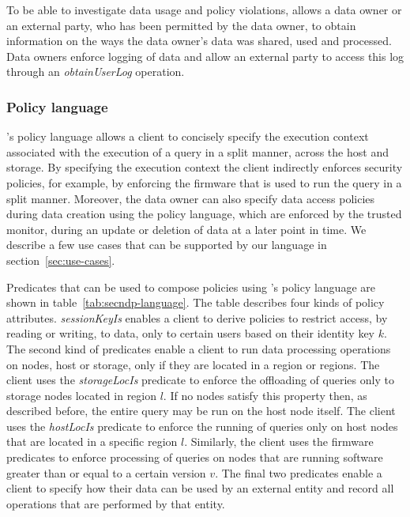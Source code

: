 To be able to investigate data usage and policy violations, \project{} allows a data owner or an external party, who has been permitted by the data owner, to obtain information on the ways the data owner's data was shared, used and processed. Data owners enforce logging of data and allow an external party to access this log through an \emph{obtainUserLog} operation.

\subsubsection{Policy language}


\project{}'s policy language allows a client to concisely specify the execution context associated with the execution of a query in a split manner, across the host and storage. By specifying the execution context the client indirectly enforces security policies, for example, by enforcing the firmware that is used to run the query in a split manner. Moreover, the data owner can also specify data access policies during data creation using the policy language, which are enforced by the trusted monitor, during an update or deletion of data at a later point in time. We describe a few use cases that can be supported by our language in section~\ref{sec:use-cases}.

Predicates that can be used to compose policies using \project{}'s policy language are shown in table~\ref{tab:secndp-language}. The table describes four kinds of policy attributes. \emph{sessionKeyIs} enables a client to derive policies to restrict access, by reading or writing, to data, only to certain users based on their identity key $k$. The second kind of predicates enable a client to run data processing operations on nodes, host or storage, only if they are located in a region or regions. The client uses the \emph{storageLocIs} predicate to enforce the offloading of queries only to storage nodes located in region $l$. If no nodes satisfy this property then, as described before, the entire query may be run on the host node itself. The client uses the \emph{hostLocIs} predicate to enforce the running of queries only on host nodes that are located in a specific region $l$. Similarly, the client uses the firmware predicates to enforce processing of queries on nodes that are running software greater than or equal to a certain version $v$. The final two predicates enable a client to specify how their data can be used by an external entity and record all operations that are performed by that entity.

